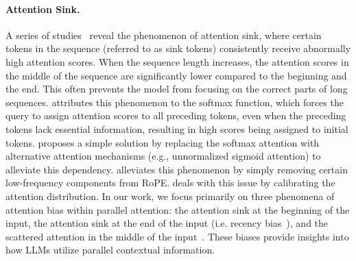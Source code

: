 \paragraph{Attention Sink.}
A series of studies~\citep{gu2024attention, xiao2023efficient, liu2024lost} reveal the phenomenon of attention sink, where certain tokens in the sequence (referred to as sink tokens) consistently receive abnormally high attention scores. When the sequence length increases, the attention scores in the middle of the sequence are significantly lower compared to the beginning and the end. This often prevents the model from focusing on the correct parts of long sequences. \citet{xiao2023efficient} attributes this phenomenon to the softmax function, which forces the query to assign attention scores to all preceding tokens, even when the preceding tokens lack essential information, resulting in high scores being assigned to initial tokens. \citet{gu2024attention} proposes a simple solution by replacing the softmax attention with alternative attention mechanisms (e.g., unnormalized sigmoid attention) to alleviate this dependency. \citet{chen2024hope} alleviates this phenomenon by simply removing certain low-frequency components from RoPE. \citet{yu2024unveiling} deals with this issue by calibrating the attention distribution. In our work, we focus primarily on three phenomena of attention bias within parallel attention: the attention sink at the beginning of the input, the attention sink at the end of the input (i.e. recency bias~\citealt{peysakhovich2023attention}), and the scattered attention in the middle of the input~\citep{yu2024unveiling}. These biases provide insights into how LLMs utilize parallel contextual information.